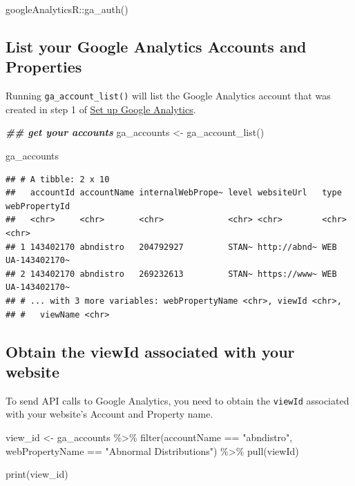\documentclass[
]{book}
\newenvironment{Shaded}{\begin{snugshade}}{\end{snugshade}}
\newcommand{\DocumentationTok}[1]{\textcolor[rgb]{0.56,0.35,0.01}{\textbf{\textit{#1}}}}
\newcommand{\FunctionTok}[1]{\textcolor[rgb]{0.00,0.00,0.00}{#1}}
\newcommand{\NormalTok}[1]{#1}
\newcommand{\OtherTok}[1]{\textcolor[rgb]{0.56,0.35,0.01}{#1}}
\newcommand{\SpecialCharTok}[1]{\textcolor[rgb]{0.00,0.00,0.00}{#1}}
\newcommand{\StringTok}[1]{\textcolor[rgb]{0.31,0.60,0.02}{#1}}
\begin{document}
\begin{Shaded}
\begin{Highlighting}[]
\NormalTok{googleAnalyticsR}\SpecialCharTok{::}\FunctionTok{ga\_auth}\NormalTok{()}
\end{Highlighting}
\end{Shaded}

\hypertarget{list-your-google-analytics-accounts-and-properties}{%
\subsection{List your Google Analytics Accounts and Properties}\label{list-your-google-analytics-accounts-and-properties}}

Running \texttt{ga\_account\_list()} will list the Google Analytics account that was created in step 1 of \protect\hyperlink{ga-setup}{Set up Google Analytics}.

\begin{Shaded}
\begin{Highlighting}[]
\DocumentationTok{\#\# get your accounts}
\NormalTok{ga\_accounts }\OtherTok{\textless{}{-}} \FunctionTok{ga\_account\_list}\NormalTok{()}

\NormalTok{ga\_accounts}
\end{Highlighting}
\end{Shaded}

\begin{verbatim}
## # A tibble: 2 x 10
##   accountId accountName internalWebPrope~ level websiteUrl   type  webPropertyId
##   <chr>     <chr>       <chr>             <chr> <chr>        <chr> <chr>        
## 1 143402170 abndistro   204792927         STAN~ http://abnd~ WEB   UA-143402170~
## 2 143402170 abndistro   269232613         STAN~ https://www~ WEB   UA-143402170~
## # ... with 3 more variables: webPropertyName <chr>, viewId <chr>,
## #   viewName <chr>
\end{verbatim}

\hypertarget{obtain-the-viewid-associated-with-your-website}{%
\subsection{Obtain the viewId associated with your website}\label{obtain-the-viewid-associated-with-your-website}}

To send API calls to Google Analytics, you need to obtain the \texttt{viewId} associated with your website's Account and Property name.

\begin{Shaded}
\begin{Highlighting}[]
\NormalTok{view\_id }\OtherTok{\textless{}{-}}\NormalTok{ ga\_accounts }\SpecialCharTok{\%\textgreater{}\%}
  \FunctionTok{filter}\NormalTok{(accountName }\SpecialCharTok{==} \StringTok{"abndistro"}\NormalTok{, webPropertyName }\SpecialCharTok{==} \StringTok{"Abnormal Distributions"}\NormalTok{) }\SpecialCharTok{\%\textgreater{}\%}
  \FunctionTok{pull}\NormalTok{(viewId)}

\FunctionTok{print}\NormalTok{(view\_id)}
\end{Highlighting}
\end{Shaded}
\end{document}
